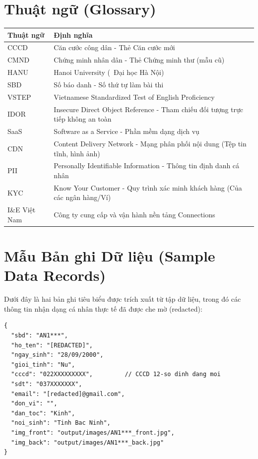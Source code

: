\documentclass[12pt,a4paper]{article}
\begin{document}
\section{Thuật ngữ (Glossary)}
\label{app:glossary}

\begin{table}[H]
\centering
\begin{tabular}{@{}p{3.5cm}p{11cm}@{}}
\toprule
\textbf{Thuật ngữ} & \textbf{Định nghĩa} \\
\midrule
CCCD & Căn cước công dân - Thẻ Căn cước mới \\
CMND & Chứng minh nhân dân - Thẻ Chứng minh thư (mẫu cũ) \\
HANU & Hanoi University (\ Đại học Hà Nội) \\
SBD & Số báo danh - Số thứ tự làm bài thi \\
VSTEP & Vietnamese Standardized Test of English Proficiency \\
IDOR & Insecure Direct Object Reference - Tham chiếu đối tượng trực tiếp không an toàn \\
SaaS & Software as a Service - Phần mềm dạng dịch vụ \\
CDN & Content Delivery Network - Mạng phân phối nội dung (Tệp tin tĩnh, hình ảnh) \\
PII & Personally Identifiable Information - Thông tin định danh cá nhân \\
KYC & Know Your Customer - Quy trình xác minh khách hàng (Của các ngân hàng/Ví) \\
I\&E Việt Nam & Công ty cung cấp và vận hành nền tảng Connections \\
\bottomrule
\end{tabular}
\end{table}

\section{Mẫu Bản ghi Dữ liệu (Sample Data Records)}
\label{app:samples}

Dưới đây là hai bản ghi tiêu biểu được trích xuất từ tập dữ liệu, trong đó các thông tin nhận dạng cá nhân thực tế đã được che mờ (redacted):

\begin{lstlisting}[language={},title={Bản ghi Mẫu 1 (Đã che mờ)}]
{
  "sbd": "AN1***",
  "ho_ten": "[REDACTED]",
  "ngay_sinh": "28/09/2000",
  "gioi_tinh": "Nu",
  "cccd": "022XXXXXXXXX",         // CCCD 12-so dinh dang moi
  "sdt": "037XXXXXXX",
  "email": "[redacted]@gmail.com",
  "don_vi": "",
  "dan_toc": "Kinh",
  "noi_sinh": "Tinh Bac Ninh",
  "img_front": "output/images/AN1***_front.jpg",
  "img_back": "output/images/AN1***_back.jpg"
}
\end{lstlisting}
\end{document}
